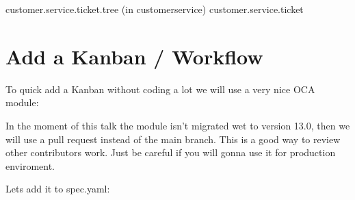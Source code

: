 \documentclass[letterpaper,10pt,english]{sphinxmanual}
\begin{document}
%
\begin{sphinxVerbatim}[commandchars=\\\{\}]
  
     customer.service.ticket.tree (in customer\PYGZus{}service)
     customer.service.ticket
      
             
             
             
\end{sphinxVerbatim}
\sphinxresetverbatimhllines


\section{Add a Kanban / Workflow}
\label{\detokenize{technical:add-a-kanban-workflow}}
To quick add a Kanban without coding a lot we will use a very nice OCA module: 

In the moment of this talk the module isn’t migrated wet to version 13.0, then we will use a pull request instead of the main branch.
This is a good way to review other contributors work. Just be careful if you will gonna use it for production enviroment.


Lets add it to spec.yaml:
\end{document}
